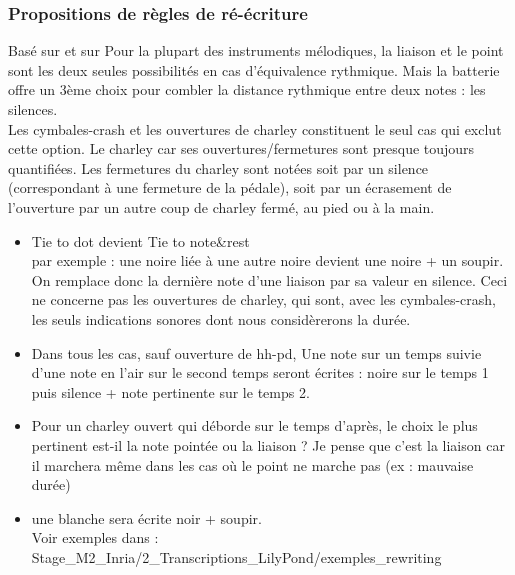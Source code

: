 \subsubsection*{Propositions de règles de ré-écriture}
Basé sur \cite{jacquemard:hal-01134096} et sur \cite{jacquemard:hal-01403982}
Pour la plupart des instruments mélodiques, la liaison et le point sont les deux seules possibilités en cas d’équivalence rythmique. Mais la batterie offre un 3ème choix pour combler la distance rythmique entre deux notes : les silences.\\Les cymbales-crash et les ouvertures de charley constituent le seul cas qui exclut cette option. Le charley car ses ouvertures/fermetures sont presque toujours quantifiées. Les fermetures du charley sont notées soit par un silence (correspondant à une fermeture de la pédale), soit par un écrasement de l’ouverture par un autre coup de charley fermé, au pied ou à la main.
\begin{itemize}
\item 
Tie to dot devient Tie to note\&rest\\
par exemple : une noire liée à une autre noire devient une noire + un soupir.\\
On remplace donc la dernière note d’une liaison par sa valeur en silence.
Ceci ne concerne pas les ouvertures de charley, qui sont, avec les cymbales-crash, les seuls indications sonores dont nous considèrerons la durée.
\item 
Dans tous les cas, sauf ouverture de hh-pd, Une note sur un temps suivie d’une note en l’air sur le second temps seront écrites : noire sur le temps 1 puis silence + note pertinente sur le temps 2.
\item
Pour un charley ouvert qui déborde sur le temps d’après, le choix le plus pertinent est-il la note pointée ou la liaison ? Je pense que c’est la liaison car il marchera même dans les cas où le point ne marche pas (ex : mauvaise durée)
\item
une blanche sera écrite noir + soupir.\\
Voir exemples dans :
Stage\_M2\_Inria/2\_Transcriptions\_LilyPond/exemples\_rewriting
\end{itemize}
